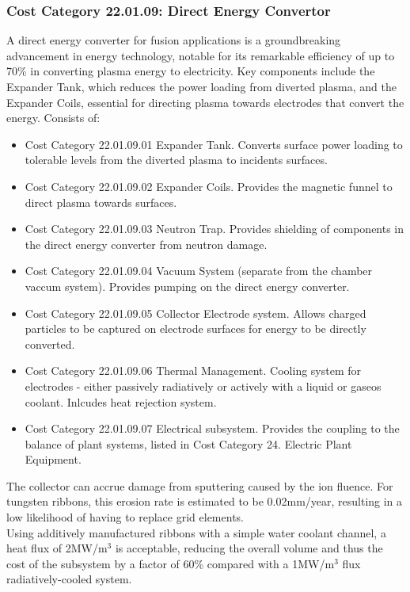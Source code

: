 \subsubsection*{Cost Category 22.01.09: Direct Energy Convertor}

A direct energy converter for fusion applications is a groundbreaking advancement in energy technology, notable for its remarkable efficiency of up to 70\% in converting plasma energy to electricity. Key components include the Expander Tank, which reduces the power loading from diverted plasma, and the Expander Coils, essential for directing plasma towards electrodes that convert the energy.  Consists of:

\begin{itemize}
    \item Cost Category 22.01.09.01 Expander Tank. Converts surface power loading to tolerable levels from the diverted plasma to incidents surfaces.
    \item Cost Category 22.01.09.02 Expander Coils.  Provides the magnetic funnel to direct plasma towards surfaces.
    \item Cost Category 22.01.09.03 Neutron Trap.  Provides shielding of components in the direct energy converter from neutron damage.
    \item Cost Category 22.01.09.04 Vacuum System (separate from the chamber vaccum system).  Provides pumping on the direct energy converter.
    \item Cost Category 22.01.09.05 Collector Electrode system.  Allows charged particles to be captured on electrode surfaces for energy to be directly converted.
    \item Cost Category 22.01.09.06 Thermal Management.  Cooling system for electrodes - either passively radiatively or actively with a liquid or gaseos coolant.  Inlcudes heat rejection system.
    \item Cost Category 22.01.09.07 Electrical subsystem.  Provides the coupling to the balance of plant systems, listed in Cost Category 24. Electric Plant Equipment.
\end{itemize}


The collector can accrue damage from sputtering caused by the ion fluence. For tungsten ribbons, this erosion rate is estimated to be 0.02mm/year, resulting in a low likelihood of having to replace grid elements.\\

Using additively manufactured ribbons with a simple water coolant channel, a heat flux of 2MW/m$^3$ is acceptable, reducing the overall volume and thus the cost of the subsystem by a factor of 60\% compared with a 1MW/m$^3$ flux radiatively-cooled system.\\


